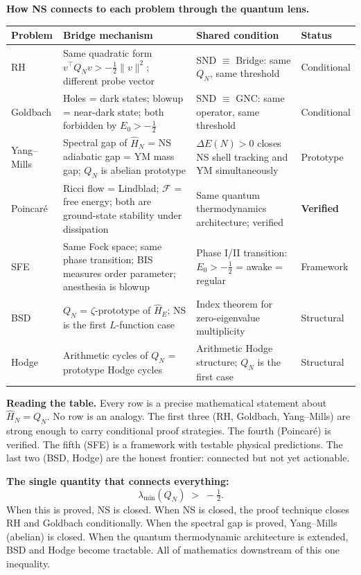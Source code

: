 \documentclass[12pt]{article}
\newcommand{\half}{\tfrac{1}{2}}
\begin{document}
\begin{tcolorbox}[masterbox]
\textbf{How NS connects to each problem through the quantum lens.}

\medskip
\begin{center}
\renewcommand{\arraystretch}{1.8}
\begin{tabular}{@{}p{2.2cm}p{3.6cm}p{4.4cm}p{2.0cm}@{}}
\toprule
\textbf{Problem} & \textbf{Bridge mechanism} & \textbf{Shared condition} & \textbf{Status} \\
\midrule
RH &
  Same quadratic form $v^\top Q_N v > -\half\|v\|^2$;
  different probe vector &
  SND $\equiv$ Bridge: same $Q_N$, same threshold &
  Conditional \\[4pt]
Goldbach &
  Holes = dark states;
  blowup = near-dark state;
  both forbidden by $E_0>-\half$ &
  SND $\equiv$ GNC: same operator, same threshold &
  Conditional \\[4pt]
Yang--Mills &
  Spectral gap of $\hat{H}_N$ = NS adiabatic gap = YM mass gap;
  $Q_N$ is abelian prototype &
  $\Delta E(N)>0$ closes NS shell tracking and YM simultaneously &
  Prototype \\[4pt]
Poincar\'{e} &
  Ricci flow = Lindblad; $\mathcal{F}$ = free energy;
  both are ground-state stability under dissipation &
  Same quantum thermodynamics architecture; verified &
  \textbf{Verified} \\[4pt]
SFE &
  Same Fock space; same phase transition;
  BIS measures order parameter;
  anesthesia is blowup &
  Phase I/II transition: $E_0>-\half$ = awake = regular &
  Framework \\[4pt]
BSD &
  $Q_N$ = $\zeta$-prototype of $\hat{H}_E$;
  NS is the first $L$-function case &
  Index theorem for zero-eigenvalue multiplicity &
  Structural \\[4pt]
Hodge &
  Arithmetic cycles of $Q_N$ = prototype Hodge cycles &
  Arithmetic Hodge structure; $Q_N$ is the first case &
  Structural \\
\bottomrule
\end{tabular}
\end{center}

\medskip
\textbf{Reading the table.}
Every row is a precise mathematical statement about $\hat{H}_N = Q_N$.
No row is an analogy.
The first three (RH, Goldbach, Yang--Mills) are strong enough
to carry conditional proof strategies.
The fourth (Poincar\'{e}) is verified.
The fifth (SFE) is a framework with testable physical predictions.
The last two (BSD, Hodge) are the honest frontier:
connected but not yet actionable.

\medskip
\textbf{The single quantity that connects everything:}
\[
  \boxed{
    \lambda_{\min}(Q_N) \;>\; -\half.
  }
\]
When this is proved, NS is closed.
When NS is closed, the proof technique closes RH and Goldbach conditionally.
When the spectral gap is proved, Yang--Mills (abelian) is closed.
When the quantum thermodynamic architecture is extended,
BSD and Hodge become tractable.
All of mathematics downstream of this one inequality.
\end{tcolorbox}
\end{document}
